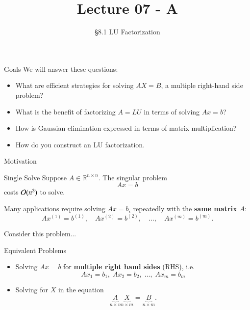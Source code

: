 \documentclass[10pt]{beamer}
\title[Math/CS 375]{Lecture 07 - A}
\subtitle{\S 8.1 LU Factorization}
\begin{document}
\begin{frame}
  \titlepage
\end{frame}
\begin{frame}{Goals}
We will answer these questions:\\[3mm]
\begin{itemize}
    \item What are efficient strategies for solving $AX=B$, a multiple right-hand side problem?
    \item What is the benefit of factorizing $A=LU$ in terms of solving $Ax=b$?
    \item How is Gaussian elimination expressed in terms of matrix multiplication?
    \item How do you construct an LU factorization.
\end{itemize}
\end{frame}



\begin{frame}{Motivation}

\begin{block}{Single Solve}
Suppose $A\in\mathbb{R}^{n\times n}$. The singular problem
$$
    Ax=b
$$
costs ${\mathcal{O}}(n^3)$ to solve.
\end{block}

Many applications require solving $Ax=b_i$ repeatedly
with the \textbf{same matrix $A$}:
\[
    Ax^{(1)}=b^{(1)},\quad
    Ax^{(2)}=b^{(2)},\quad \ldots,\quad
    Ax^{(m)}=b^{(m)}.
\]


\end{frame}


\begin{frame}{Consider this problem...}

\begin{block}{Equivalent Problems}
\begin{itemize}
    \item Solving $Ax=b$ for \textbf{multiple right hand sides} (RHS), i.e.
    $$ Ax_1 = b_1,\; Ax_2=b_2,\; \dots,\; Ax_m = b_m$$ 
    
    \item Solving for $X$ in the equation 
    $$ \underbrace{A}_{n \times n} \underbrace{X}_{n\times m} = \underbrace{B}_{n\times m}.$$
\end{itemize}
\end{block}


\end{frame}
\end{document}

